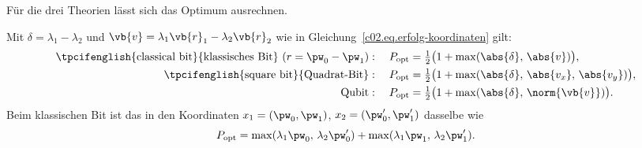 Für die drei Theorien lässt sich das Optimum ausrechnen.

\begin{proposition}\label{c02.prop.optimum}
  Mit $\delta = \lambda_1 - \lambda_2$ und $\vb{v} = \lambda_1 \vb{r}_1 - \lambda_2 \vb{r}_2$
  wie in Gleichung~\eqref{c02.eq.erfolg-koordinaten} gilt:
  \begin{align}
    \text{\tpcifenglish{classical bit}{klassisches Bit}}\ (r = \pw_0 - \pw_1):\quad
      P_{\mathrm{opt}} &= \tfrac12\bigl(1 + \max(\abs{\delta},\, \abs{v})\bigr),
      \label{c02.eq.opt-bit} \\
    \text{\tpcifenglish{square bit}{Quadrat-Bit}}:\quad
      P_{\mathrm{opt}} &= \tfrac12\bigl(1 + \max(\abs{\delta},\, \abs{v_x},\, \abs{v_y})\bigr),
      \label{c02.eq.opt-quadrat} \\
    \text{Qubit}:\quad
      P_{\mathrm{opt}} &= \tfrac12\bigl(1 + \max(\abs{\delta},\, \norm{\vb{v}})\bigr).
      \label{c02.eq.opt-qubit}
  \end{align}
  Beim klassischen Bit ist das in den Koordinaten $x_1 = (\pw_0, \pw_1)$,
  $x_2 = (\pw'_0, \pw'_1)$ dasselbe wie
  \begin{equation}\label{c02.eq.opt-bit-p}
    P_{\mathrm{opt}} = \max(\lambda_1 \pw_0,\, \lambda_2 \pw'_0) + \max(\lambda_1 \pw_1,\, \lambda_2 \pw'_1) .
  \end{equation}
\end{proposition}
